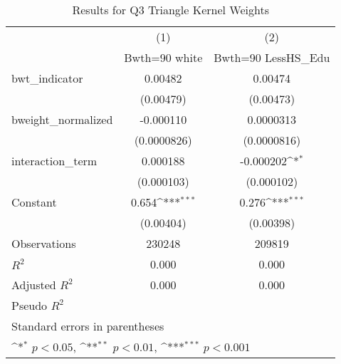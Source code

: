 \documentclass{article}
\begin{document}
\begin{table}[H]\centering
\def\sym#1{\ifmmode^{#1}\else\(^{#1}\)\fi}
\caption{Results for Q3 Triangle Kernel Weights \label{q3tri}}
\begin{tabular}{l*{2}{c}}
\toprule
                    &\multicolumn{1}{c}{(1)}&\multicolumn{1}{c}{(2)}\\
                    &\multicolumn{1}{c}{Bwth=90 white}&\multicolumn{1}{c}{Bwth=90 LessHS\_Edu}\\
\midrule
bwt\_indicator       &     0.00482         &     0.00474         \\
                    &   (0.00479)         &   (0.00473)         \\
\addlinespace
bweight\_normalized  &   -0.000110         &   0.0000313         \\
                    & (0.0000826)         & (0.0000816)         \\
\addlinespace
interaction\_term    &    0.000188         &   -0.000202\sym{*}  \\
                    &  (0.000103)         &  (0.000102)         \\
\addlinespace
Constant            &       0.654\sym{***}&       0.276\sym{***}\\
                    &   (0.00404)         &   (0.00398)         \\
\midrule
Observations        &      230248         &      209819         \\
\(R^{2}\)           &       0.000         &       0.000         \\
Adjusted \(R^{2}\)  &       0.000         &       0.000         \\
Pseudo \(R^{2}\)    &                     &                     \\
\bottomrule
\multicolumn{3}{l}{\footnotesize Standard errors in parentheses}\\
\multicolumn{3}{l}{\footnotesize \sym{*} \(p<0.05\), \sym{**} \(p<0.01\), \sym{***} \(p<0.001\)}\\
\end{tabular}
\end{table}
\end{document}
